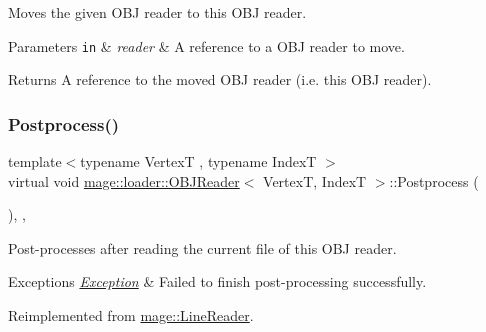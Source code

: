 Moves the given O\+BJ reader to this O\+BJ reader.


\begin{DoxyParams}[1]{Parameters}
\mbox{\tt in}  & {\em reader} & A reference to a O\+BJ reader to move. \\
\hline
\end{DoxyParams}
\begin{DoxyReturn}{Returns}
A reference to the moved O\+BJ reader (i.\+e. this O\+BJ reader). 
\end{DoxyReturn}
\hypertarget{classmage_1_1loader_1_1_o_b_j_reader_ae8bc7d40a019523546d61bdfd599c368}{}\label{classmage_1_1loader_1_1_o_b_j_reader_ae8bc7d40a019523546d61bdfd599c368} 
\subsubsection{\texorpdfstring{Postprocess()}{Postprocess()}}
{\footnotesize\ttfamily template$<$typename VertexT , typename IndexT $>$ \\
virtual void \hyperlink{classmage_1_1loader_1_1_o_b_j_reader}{mage\+::loader\+::\+O\+B\+J\+Reader}$<$ VertexT, IndexT $>$\+::Postprocess (\begin{DoxyParamCaption}{ }\end{DoxyParamCaption})\hspace{0.3cm}{\ttfamily [override]}, {\ttfamily [private]}, {\ttfamily [virtual]}}

Post-\/processes after reading the current file of this O\+BJ reader.


\begin{DoxyExceptions}{Exceptions}
{\em \hyperlink{classmage_1_1_exception}{Exception}} & Failed to finish post-\/processing successfully. \\
\hline
\end{DoxyExceptions}


Reimplemented from \hyperlink{classmage_1_1_line_reader_adfde21013140a1058d3dd567204abfb5}{mage\+::\+Line\+Reader}.

\hypertarget{classmage_1_1loader_1_1_o_b_j_reader_a42cb85a0d14f9cc1caff68ae2cf84301}{}\label{classmage_1_1loader_1_1_o_b_j_reader_a42cb85a0d14f9cc1caff68ae2cf84301} 
